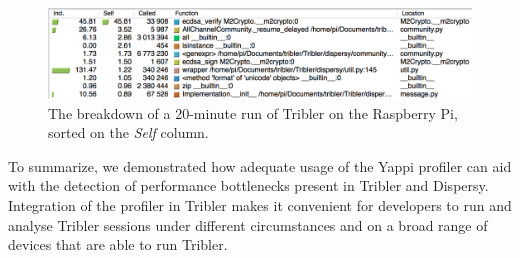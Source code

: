 \begin{figure}[!h]
	\centering
	\includegraphics[width=1.0\columnwidth]{images/experiments/yappi_breakdown_self}
	\caption{The breakdown of a 20-minute run of Tribler on the Raspberry Pi, sorted on the \emph{Self} column.}
	\label{fig:yappi_breakdown_self}
\end{figure}

\noindent To summarize, we demonstrated how adequate usage of the Yappi profiler can aid with the detection of performance bottlenecks present in Tribler and Dispersy. Integration of the profiler in Tribler makes it convenient for developers to run and analyse Tribler sessions under different circumstances and on a broad range of devices that are able to run Tribler.


